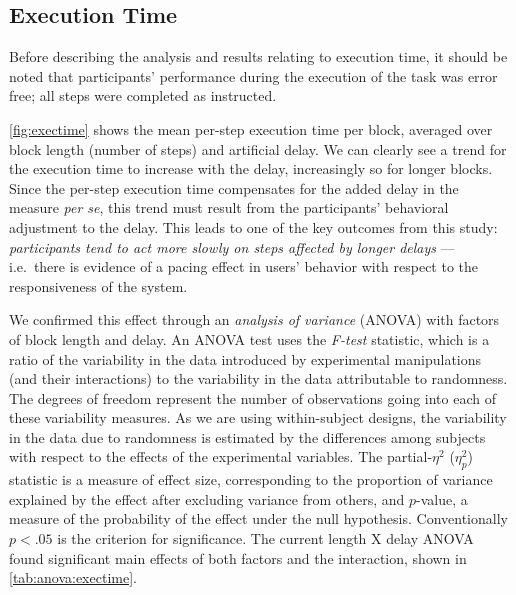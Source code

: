 \documentclass[10pt,letterpaper]{article}
\begin{document}
\subsection{Execution Time}


Before describing the analysis and results relating to execution time, it should be noted that participants' performance during the execution of the task was error free; all steps were completed as instructed. 

\cref{fig:exectime} shows the mean per-step execution time per block, averaged over block length (number of steps) and artificial delay.
We can clearly see a trend for the execution time to increase with the delay, increasingly so for longer blocks. 
Since the per-step execution time  compensates for the added delay in the measure \emph{per se}, this trend must result from the participants' behavioral adjustment to the delay.
This leads to one of the key outcomes from this study: 
\emph{participants tend to act more slowly on steps affected by longer delays} --- i.e.\ there is evidence of a pacing effect in users' behavior with respect to the responsiveness of the system.

We confirmed this effect through an \emph{analysis of variance} (ANOVA) with factors of block length and delay.
An ANOVA test uses the \emph{F-test} statistic, which is a ratio of the variability in the data introduced by experimental manipulations (and their interactions) to the variability in the data attributable to randomness.
The degrees of freedom represent the number of observations going into each of these variability measures.
As we are using within-subject designs, the variability in the data due to randomness is estimated by the differences among subjects with respect to the effects of the experimental variables.
The partial-\( \eta^2 \) (\(\eta_{p}^{2}\)) statistic is a measure of effect size, corresponding to the proportion of variance explained by the effect after excluding variance from others, and \( p \)-value, a measure of the probability of the effect under the null hypothesis.
Conventionally \( p < .05 \) is the criterion for significance.
The current length X delay ANOVA found significant main effects of both factors and the interaction, shown in \cref{tab:anova:exectime}.
\end{document}
